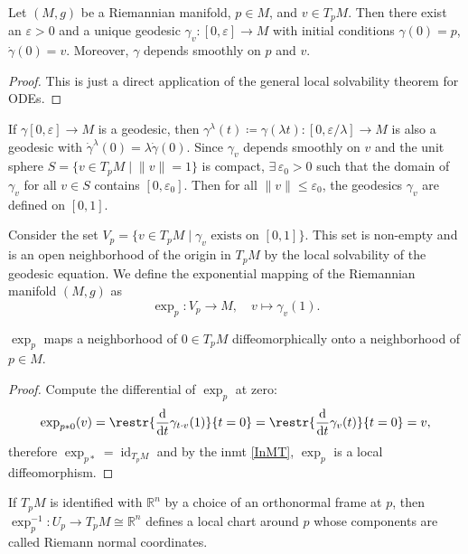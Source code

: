 \documentclass[english,letterpaper]{article}%
\numberwithin{equation}{section}
\numberwithin{figure}{section}
\numberwithin{table}{section}
\theoremstyle{definition}
\theoremstyle{definition}
\theoremstyle{definition}
\theoremstyle{plain}
\theoremstyle{plain}
\theoremstyle{plain}
\theoremstyle{plain}
\theoremstyle{remark}
\theoremstyle{remark}
\newcommand{\dd}{{\mathrm{d}}}
\renewcommand{\leq}{\leqslant}
\DeclareMathOperator{\id}{id}
\begin{document}
\begin{lem}
    Let $(M,g)$ be a Riemannian manifold, $p\in M$, and $v\in T_p M$. Then there exist an $\varepsilon>0$ and a unique geodesic $\gamma_v:[0,\varepsilon]\to M$ with initial conditions $\gamma(0)=p$, $\dot\gamma(0)=v$. Moreover, $\gamma $ depends smoothly on $p$ and $v$.
\end{lem}
\begin{proof}
    This is just a direct application of the general local solvability theorem for ODEs.
\end{proof}
\begin{cor}
    If $\gamma[0,\varepsilon]\to M$ is a geodesic, then $\gamma^\lambda(t)\coloneqq \gamma(\lambda t):[0,\varepsilon/\lambda]\to M$ is also a geodesic with $\dot\gamma^\lambda(0)=\lambda\dot\gamma(0)$. Since $\gamma_v$ depends smoothly on $v$ and the unit sphere $S=\{v\in T_pM\mid \lVert v\rVert=1\}$ is compact, $\exists\,\varepsilon_0>0$ such that the domain of $\gamma_v$ for all $v\in S$ contains $[0,\varepsilon_0]$. Then for all $\lVert v\rVert\leq \varepsilon_0$, the geodesics $\gamma_v$ are defined on $[0,1]$.
\end{cor}
\begin{defn}
    Consider the set $V_p=\{v\in T_p M\mid \gamma_v \text{ exists on }[0,1]\}$. This set is non-empty and is an open neighborhood of the origin in $T_p M$ by the local solvability of the geodesic equation. We define the exponential mapping of the Riemannian manifold $(M,g)$ as
    \[\exp_p :V_p\to M,\quad v\mapsto \gamma_v(1).\]
\end{defn}

\begin{thm}
    $\exp_p$ maps a neighborhood of $0\in T_pM$ diffeomorphically onto a neighborhood of $p\in M$.
\end{thm}
\begin{proof}
    Compute the differential of $\exp_p$ at zero:
    \[\exp_{p\ast0}(v)=\restr{\frac{\dd}{\dd t}\gamma_{t\cdot v}(1)}{t=0}=\restr{\frac{\dd}{\dd t}\gamma_{v}(t)}{t=0}=v,\]
    therefore $\exp_{p\ast}=\id_{T_p M}$ and by the \gls{inmt} \ref{InMT}, $\exp_p$ is a local diffeomorphism.
\end{proof}

\begin{defn}
    If $T_p M$ is identified with $\mathbb{R}^n$ by a choice of an orthonormal frame at $p$, then $\exp_p^{-1}:U_p\to T_p M\cong\mathbb{R}^n$ defines a local chart around $p$ whose components are called Riemann normal coordinates.
\end{defn}
\end{document}

